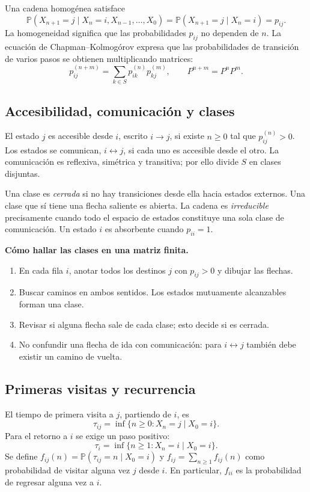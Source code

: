 \documentclass[11pt,oneside]{article}
\newcommand{\Prob}{\mathbb{P}}
\newcommand{\1}{\mathbf{1}}
\begin{document}
Una cadena homogénea satisface
\[
\Prob(X_{n+1}=j\mid X_n=i,X_{n-1},\ldots,X_0)
 =\Prob(X_{n+1}=j\mid X_n=i)=p_{ij}.
\]
La homogeneidad significa que las probabilidades $p_{ij}$ no dependen de $n$. La ecuación de Chapman--Kolmogórov expresa que las probabilidades de transición de varios pasos se obtienen multiplicando matrices:
\[
p_{ij}^{(n+m)}=\sum_{k\in S}p_{ik}^{(n)}p_{kj}^{(m)},
\qquad P^{n+m}=P^nP^m.
\]

\subsection{Accesibilidad, comunicación y clases}

El estado $j$ es accesible desde $i$, escrito $i\to j$, si existe $n\geq 0$ tal que $p_{ij}^{(n)}>0$. Los estados se comunican, $i\leftrightarrow j$, si cada uno es accesible desde el otro. La comunicación es reflexiva, simétrica y transitiva; por ello divide $S$ en clases disjuntas.

Una clase es \emph{cerrada} si no hay transiciones desde ella hacia estados externos. Una clase que sí tiene una flecha saliente es abierta. La cadena es \emph{irreducible} precisamente cuando todo el espacio de estados constituye una sola clase de comunicación. Un estado $i$ es absorbente cuando $p_{ii}=1$.

\textbf{Cómo hallar las clases en una matriz finita.}
\begin{enumerate}
  \item En cada fila $i$, anotar todos los destinos $j$ con $p_{ij}>0$ y dibujar las flechas.
  \item Buscar caminos en ambos sentidos. Los estados mutuamente alcanzables forman una clase.
  \item Revisar si alguna flecha sale de cada clase; esto decide si es cerrada.
  \item No confundir una flecha de ida con comunicación: para $i\leftrightarrow j$ también debe existir un camino de vuelta.
\end{enumerate}

\subsection{Primeras visitas y recurrencia}

El tiempo de primera visita a $j$, partiendo de $i$, es
\[
\tau_{ij}=\inf\{n\geq 0:X_n=j\mid X_0=i\}.
\]
Para el retorno a $i$ se exige un paso positivo:
\[
\tau_i=\inf\{n\geq 1:X_n=i\mid X_0=i\}.
\]
Se define $f_{ij}(n)=\Prob(\tau_{ij}=n\mid X_0=i)$ y $f_{ij}=\sum_{n\geq 1}f_{ij}(n)$ como probabilidad de visitar alguna vez $j$ desde $i$. En particular, $f_{ii}$ es la probabilidad de regresar alguna vez a $i$.
\end{document}
